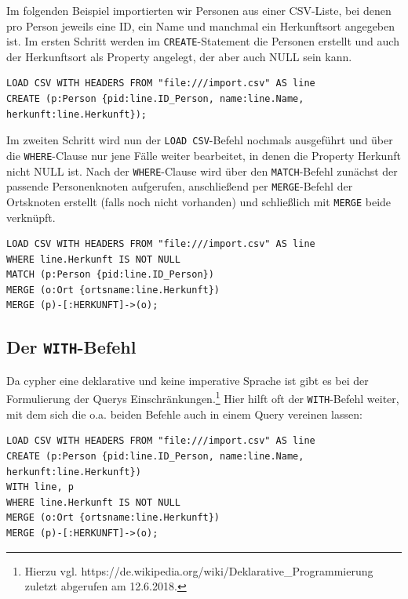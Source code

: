 Im folgenden Beispiel importierten wir Personen aus einer CSV-Liste, bei
denen pro Person jeweils eine ID, ein Name und manchmal ein Herkunftsort
angegeben ist. Im ersten Schritt werden im \texttt{CREATE}-Statement die
Personen erstellt und auch der Herkunftsort als Property angelegt, der
aber auch NULL sein kann.

\begin{verbatim}
LOAD CSV WITH HEADERS FROM "file:///import.csv" AS line
CREATE (p:Person {pid:line.ID_Person, name:line.Name, herkunft:line.Herkunft});
\end{verbatim}

Im zweiten Schritt wird nun der \texttt{LOAD\ CSV}-Befehl nochmals
ausgeführt und über die \texttt{WHERE}-Clause nur jene Fälle weiter
bearbeitet, in denen die Property Herkunft nicht NULL ist. Nach der
\texttt{WHERE}-Clause wird über den \texttt{MATCH}-Befehl zunächst der
passende Personenknoten aufgerufen, anschließend per
\texttt{MERGE}-Befehl der Ortsknoten erstellt (falls noch nicht
vorhanden) und schließlich mit \texttt{MERGE} beide verknüpft.

\begin{verbatim}
LOAD CSV WITH HEADERS FROM "file:///import.csv" AS line
WHERE line.Herkunft IS NOT NULL
MATCH (p:Person {pid:line.ID_Person})
MERGE (o:Ort {ortsname:line.Herkunft})
MERGE (p)-[:HERKUNFT]->(o);
\end{verbatim}

\hypertarget{der-with-befehl}{%
\subsection{\texorpdfstring{Der
\texttt{WITH}-Befehl}{Der WITH-Befehl}}\label{der-with-befehl}}

Da cypher eine deklarative und keine imperative Sprache ist gibt es bei
der Formulierung der Querys Einschränkungen.\footnote{Hierzu vgl.
  https://de.wikipedia.org/wiki/Deklarative\_Programmierung zuletzt
  abgerufen am 12.6.2018.} Hier hilft oft der \texttt{WITH}-Befehl
weiter, mit dem sich die o.a. beiden Befehle auch in einem Query
vereinen lassen:

\begin{verbatim}
LOAD CSV WITH HEADERS FROM "file:///import.csv" AS line
CREATE (p:Person {pid:line.ID_Person, name:line.Name, herkunft:line.Herkunft})
WITH line, p
WHERE line.Herkunft IS NOT NULL
MERGE (o:Ort {ortsname:line.Herkunft})
MERGE (p)-[:HERKUNFT]->(o);
\end{verbatim}

